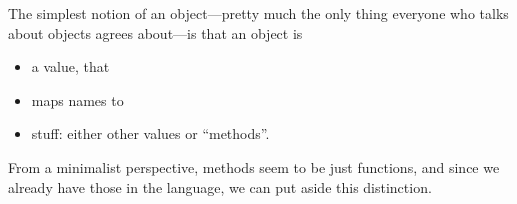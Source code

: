 
The simplest notion of an object—pretty much the only thing everyone who talks about
objects agrees about—is that an object is
\begin{itemize}[nosep]
  \item a value, that
  \item maps names to
  \item stuff: either other values or “methods”.
\end{itemize}
From a minimalist perspective, methods seem to be just functions, and since we
already have those in the language, we can put aside this distinction.

\secdown
% 
% 
% 
% 
% 
% 
% 
% 
% 
\secup
